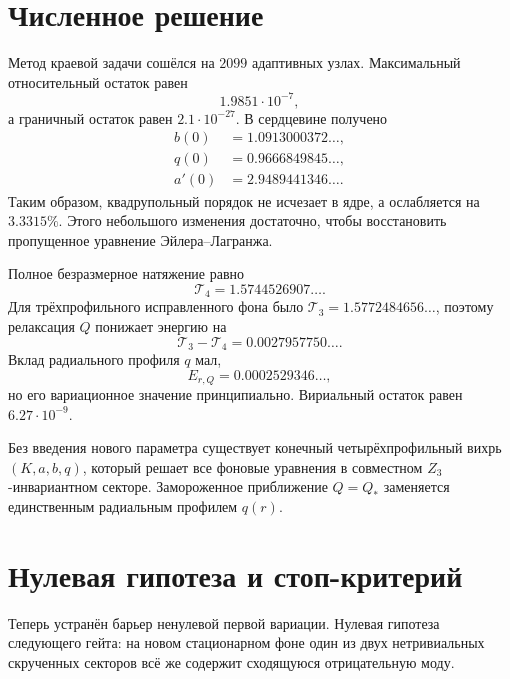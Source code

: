 \section{Численное решение}

Метод краевой задачи сошёлся на $2099$ адаптивных узлах. Максимальный
относительный остаток равен
\begin{equation}
 1.9851\cdot10^{-7},
\end{equation}
а граничный остаток равен $2.1\cdot10^{-27}$. В сердцевине получено
\begin{align}
 b(0)&=1.0913000372\ldots,\\
 q(0)&=0.9666849845\ldots,\\
 a'(0)&=2.9489441346\ldots.
\end{align}
Таким образом, квадрупольный порядок не исчезает в ядре, а ослабляется на
$3.3315\%$. Этого небольшого изменения достаточно, чтобы восстановить
пропущенное уравнение Эйлера--Лагранжа.

Полное безразмерное натяжение равно
\begin{equation}
 \mathcal T_{4}=1.5744526907\ldots.
\end{equation}
Для трёхпрофильного исправленного фона было
$\mathcal T_{3}=1.5772484656\ldots$, поэтому релаксация $Q$ понижает
энергию на
\begin{equation}
 \mathcal T_3-\mathcal T_4=0.0027957750\ldots.
\end{equation}
Вклад радиального профиля $q$ мал,
\begin{equation}
 E_{r,Q}=0.0002529346\ldots,
\end{equation}
но его вариационное значение принципиально. Вириальный остаток равен
$6.27\cdot10^{-9}$.

\begin{theorem}
Без введения нового параметра существует конечный четырёхпрофильный вихрь
$(K,a,b,q)$, который решает все фоновые уравнения в совместном
$Z_3$-инвариантном секторе. Замороженное приближение $Q=Q_*$ заменяется
единственным радиальным профилем $q(r)$.
\end{theorem}

\section{Нулевая гипотеза и стоп-критерий}

Теперь устранён барьер ненулевой первой вариации. Нулевая гипотеза следующего
гейта: на новом стационарном фоне один из двух нетривиальных скрученных
секторов всё же содержит сходящуюся отрицательную моду.

